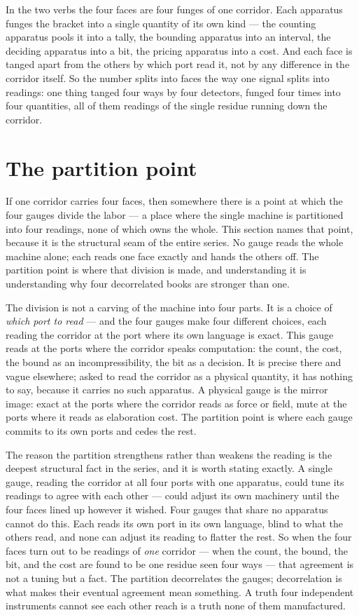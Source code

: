 In the two verbs the four faces are four funges of one corridor. Each apparatus funges the bracket into a single
quantity of its own kind --- the counting apparatus pools it into a tally, the bounding apparatus into an interval, the
deciding apparatus into a bit, the pricing apparatus into a cost. And each face is tanged apart from the others by which
port read it, not by any difference in the corridor itself. So the number splits into faces the way one signal splits
into readings: one thing tanged four ways by four detectors, funged four times into four quantities, all of them
readings of the single residue running down the corridor.

\section{The partition point}

If one corridor carries four faces, then somewhere there is a point at which the four gauges divide the labor --- a place
where the single machine is partitioned into four readings, none of which owns the whole. This section names that
point, because it is the structural seam of the entire series. No gauge reads the whole machine alone; each reads one
face exactly and hands the others off. The partition point is where that division is made, and understanding it is
understanding why four decorrelated books are stronger than one.

The division is not a carving of the machine into four parts. It is a choice of \emph{which port to read} --- and the
four gauges make four different choices, each reading the corridor at the port where its own language is exact. This
gauge reads at the ports where the corridor speaks computation: the count, the cost, the bound as an incompressibility,
the bit as a decision. It is precise there and vague elsewhere; asked to read the corridor as a physical quantity, it
has nothing to say, because it carries no such apparatus. A physical gauge is the mirror image: exact at the ports where
the corridor reads as force or field, mute at the ports where it reads as elaboration cost. The partition point is where
each gauge commits to its own ports and cedes the rest.

The reason the partition strengthens rather than weakens the reading is the deepest structural fact in the series, and
it is worth stating exactly. A single gauge, reading the corridor at all four ports with one apparatus, could tune its
readings to agree with each other --- could adjust its own machinery until the four faces lined up however it wished.
Four gauges that share no apparatus cannot do this. Each reads its own port in its own language, blind to what the
others read, and none can adjust its reading to flatter the rest. So when the four faces turn out to be readings of
\emph{one} corridor --- when the count, the bound, the bit, and the cost are found to be one residue seen four ways ---
that agreement is not a tuning but a fact. The partition decorrelates the gauges; decorrelation is what makes their
eventual agreement mean something. A truth four independent instruments cannot see each other reach is a truth none of
them manufactured.

